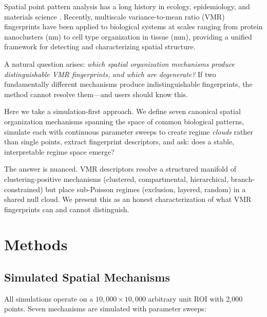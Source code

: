 \documentclass[11pt,a4paper]{article}
\begin{document}
Spatial point pattern analysis has a long history in ecology, epidemiology,
and materials science \citep{Diggle2003, Baddeley2015, Ripley1977}. Recently,
multiscale variance-to-mean ratio (VMR) fingerprints have been applied to
biological systems at scales ranging from protein nanoclusters (nm) to cell
type organization in tissue (mm), providing a unified framework for detecting
and characterizing spatial structure.

A natural question arises: \emph{which spatial organization mechanisms produce
distinguishable VMR fingerprints, and which are degenerate?} If two
fundamentally different mechanisms produce indistinguishable fingerprints, the
method cannot resolve them---and users should know this.

Here we take a simulation-first approach. We define seven canonical spatial
organization mechanisms spanning the space of common biological patterns,
simulate each with continuous parameter sweeps to create regime
\emph{clouds} rather than single points, extract fingerprint descriptors,
and ask: does a stable, interpretable regime space emerge?

The answer is nuanced. VMR descriptors resolve a structured manifold of
clustering-positive mechanisms (clustered, compartmental, hierarchical,
branch-constrained) but place sub-Poisson regimes (exclusion, layered,
random) in a shared null cloud. We present this as an honest characterization
of what VMR fingerprints can and cannot distinguish.


\section{Methods}
\label{sec:methods}

\subsection{Simulated Spatial Mechanisms}

All simulations operate on a $10{,}000 \times 10{,}000$ arbitrary unit ROI
with 2,000 points. Seven mechanisms are simulated with parameter sweeps:
\end{document}
